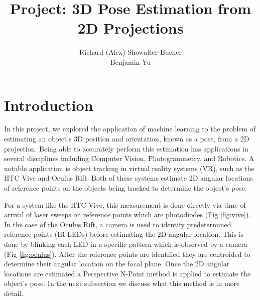 \documentclass[journal]{IEEEtran}
\begin{document}
%
\title{Project: 3D Pose Estimation from 2D Projections}
%
%
%

\author{Richard (Alex) Showalter-Bucher\\Benjamin Yu}


\maketitle

\section{Introduction}
In this project, we explored the application of machine learning to the problem of estimating an object's 3D position and orientation, known as a pose, from a 2D projection. Being able to accurately perform this estimation has applications in several disciplines including Computer Vision, Photogrammetry, and Robotics\cite{Robust_PNP}. A notable application is object tracking in virtual reality systems (VR), such as the HTC Vive and Oculus Rift. Both of these systems estimate 2D angular locations of reference points on the objects being tracked to determine the object's pose.

For a system like the HTC Vive, this measurement is done directly via time of arrival of laser sweeps on reference points which are photodiodes (Fig \ref{fig:vive}). In the case of the Oculus Rift, a camera is used to identify predetermined reference points (IR LEDs) before estimating the 2D angular location. This is done by blinking each LED in a specific pattern which is observed by a camera (Fig \ref{fig:oculus}). After the reference points are identified they are centroided to determine their angular location on the focal plane. Once the 2D angular locations are estimated a Perspective N-Point method is applied to estimate the object's pose. In the next subsection we discuss what this method is in more detail. 
\end{document}
